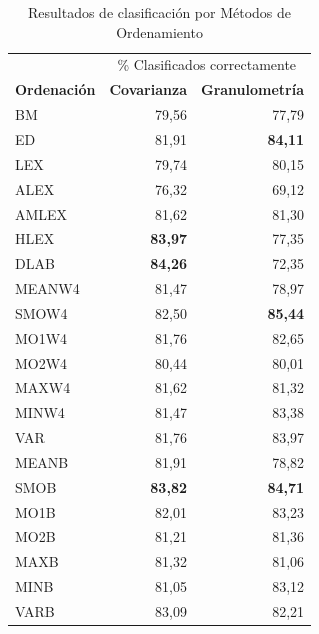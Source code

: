 \begin{table}
\caption{ Resultados de clasificación por Métodos de Ordenamiento}
\label{tab:experiment1_t1}

\begin{tabular}{@{}lrr@{}}
\toprule
&\multicolumn{2}{c}{ \% Clasificados correctamente }\\
\cline{2-3}
\textbf{Ordenación } & \textbf{Covarianza} &\textbf{Granulometría } \\ 
\cmidrule{1-3}
BM & 79,56 & 77,79 \\ \hline
ED & 81,91 & \textbf{84,11}  \\ \hline
LEX & 79,74 & 80,15 \\ \hline
ALEX & 76,32   &  69,12  \\ \hline
AMLEX &  81,62   &  81,30  \\ \hline
HLEX &  \textbf{83,97}  &  77,35  \\ \hline
DLAB  & \textbf{84,26}  & 72,35   \\ \hline
MEANW4 & 81,47 & 78,97 \\ \hline %
SMOW4 & 82,50 & \textbf{85,44} \\ \hline %
MO1W4 & 81,76 & 82,65 \\ \hline %
MO2W4 & 80,44 & 80,01 \\ \hline %
MAXW4 & 81,62 & 81,32 \\ \hline %
MINW4 & 81,47 & 83,38 \\ \hline %
VAR   & 81,76 &  83,97  \\ \hline 
MEANB & 81,91 & 78,82 \\ \hline %
SMOB & \textbf{83,82} & \textbf{84,71} \\ \hline %
MO1B & 82,01  & 83,23  \\ \hline %
MO2B & 81,21 &  81,36  \\ \hline %
MAXB & 81,32 & 81,06 \\ \hline %
MINB & 81,05 & 83,12 \\ \hline %
VARB & 83,09 &  82,21  \\ \hline 

\end{tabular}
\end{table}
